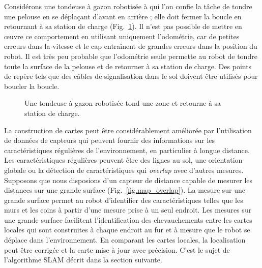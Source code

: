 Considérons une tondeuse à gazon robotisée à qui l'on confie la tâche de tondre une pelouse en se déplaçant d'avant en arrière ; elle doit fermer la boucle en retournant à sa station de charge (Fig.~\ref{fig.lawn}). Il n'est pas possible de mettre en œuvre ce comportement en utilisant uniquement l'odométrie, car de petites erreurs dans la vitesse et le cap entraînent de grandes erreurs dans la position du robot. Il est très peu probable que l'odométrie seule permette au robot de tondre toute la surface de la pelouse et de retourner à sa station de charge. Des points de repère tels que des câbles de signalisation dans le sol doivent être utilisés pour boucler la boucle.

\begin{figure}
\begin{center}
\end{center}
\caption{Une tondeuse à gazon robotisée tond une zone et retourne à sa station de charge.}
\label{fig.lawn}
\end{figure}

La construction de cartes peut être considérablement améliorée par l'utilisation de données de capteurs qui peuvent fournir des informations sur les caractéristiques régulières de l'environnement, en particulier à longue distance. Les caractéristiques régulières peuvent être des lignes au sol, une orientation globale ou la détection de caractéristiques qui \emph{overlap} avec d'autres mesures. Supposons que nous disposions d'un capteur de distance capable de mesurer les distances sur une grande surface (Fig.~\ref{fig.map_overlap}). La mesure sur une grande surface permet au robot d'identifier des caractéristiques telles que les murs et les coins à partir d'une mesure prise à un seul endroit. Les mesures sur une grande surface facilitent l'identification des chevauchements entre les cartes locales qui sont construites à chaque endroit au fur et à mesure que le robot se déplace dans l'environnement. En comparant les cartes locales, la localisation peut être corrigée et la carte mise à jour avec précision. C'est le sujet de l'algorithme SLAM décrit dans la section suivante.

